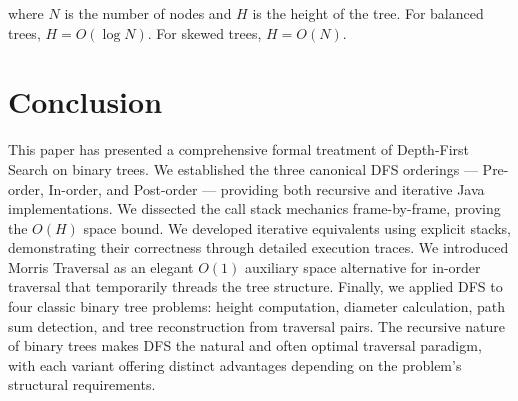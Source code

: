\documentclass[10pt,journal,compsoc,onecolumn]{IEEEtran}
\begin{document}
\noindent where $N$ is the number of nodes and $H$ is the height of the tree. For balanced trees, $H = O(\log N)$. For skewed trees, $H = O(N)$.

\section{Conclusion}

This paper has presented a comprehensive formal treatment of Depth-First Search on binary trees. We established the three canonical DFS orderings --- Pre-order, In-order, and Post-order --- providing both recursive and iterative Java implementations. We dissected the call stack mechanics frame-by-frame, proving the $O(H)$ space bound. We developed iterative equivalents using explicit stacks, demonstrating their correctness through detailed execution traces. We introduced Morris Traversal as an elegant $O(1)$ auxiliary space alternative for in-order traversal that temporarily threads the tree structure. Finally, we applied DFS to four classic binary tree problems: height computation, diameter calculation, path sum detection, and tree reconstruction from traversal pairs. The recursive nature of binary trees makes DFS the natural and often optimal traversal paradigm, with each variant offering distinct advantages depending on the problem's structural requirements.
\end{document}
